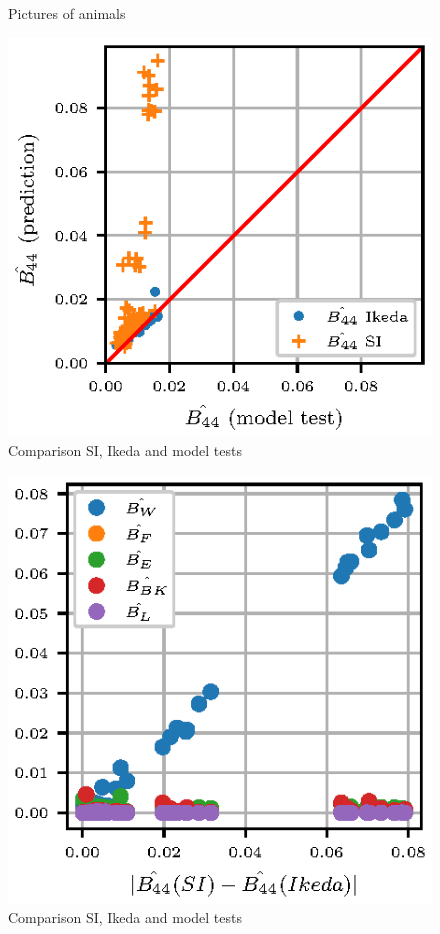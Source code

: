 \begin{figure}
    \caption{Pictures of animals}\label{fig:animals}
\end{figure}





\begin{figure}[H]
    \centering
    \includegraphics[]{figures/si_ikeda_model.eps}
        \vspace{-0.5cm}
    \caption{Comparison SI, Ikeda and model tests}
    \label{fig:si_ikeda_model}
\end{figure}

\begin{figure}[H]
    \centering
    \includegraphics[]{figures/component_residual.eps}
        \vspace{-0.5cm}
    \caption{Comparison SI, Ikeda and model tests}
    \label{fig:si_ikeda_model}
\end{figure}

